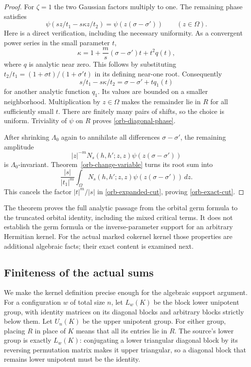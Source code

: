 \begin{proof}
For $\zeta=1$ the two Gaussian factors multiply to one.
The remaining phase satisfies
\begin{equation}\label{orb-diagonal-phase}
 \psi(sz/t_1-s\kappa z/t_2)
               =\psi(z(\sigma-\sigma'))\qquad(z\in\Omega).
\end{equation}
Here is a direct verification, including the necessary uniformity.
As a convergent power series in the small parameter $t$,
\[
 \kappa=1+\frac{m}{s}(\sigma-\sigma')t+t^2q(t),
\]
where $q$ is analytic near zero.  This follows by substituting
$t_2/t_1=(1+\sigma t)/(1+\sigma't)$ in its defining
near-one root.  Consequently
\[
 s/t_1-s\kappa/t_2
     =\sigma-\sigma'+tq_1(t)
\]
for another analytic function $q_1$.  Its values are bounded on
a smaller neighborhood.  Multiplication by $z\in\Omega$ makes
the remainder lie in $R$ for all sufficiently small $t$.
There are finitely many pairs of shifts, so the choice is uniform.
Triviality of $\psi$ on $R$ proves \eqref{orb-diagonal-phase}.

After shrinking $\Lambda_0$ again to annihilate all differences
$\sigma-\sigma'$, the remaining amplitude
\[
 |z|^{-m}N_s(h,h';z,z)\psi(z(\sigma-\sigma'))
\]
is $\Lambda_0$-invariant.  Theorem~\ref{orb-change-variable}
turns its root sum into
\[
 \frac{|s|}{|t_1|^m}
       \int_\Omega N_s(h,h';z,z)
                      \psi(z(\sigma-\sigma'))\,dz.
\]
This cancels the factor $|t|^m/|s|$ in
\eqref{orb-expanded-cut}, proving \eqref{orb-exact-cut}.
\end{proof}

The theorem proves the full analytic passage from the orbital germ
formula to the truncated orbital identity, including the mixed critical terms.
It does not establish the germ formula or the inverse-parameter
support for an arbitrary Hermitian kernel.  For the actual marked
cokernel kernel those properties are additional algebraic facts;
their exact content is examined next.

\subsection{Finiteness of the actual sums}

We make the kernel definition precise enough for the algebraic
support argument.  For a configuration $w$ of total size $n$, let
$L_w(K)$ be the block lower unipotent group, with identity matrices
on its diagonal blocks and arbitrary blocks strictly below them.
Let $U_n(K)$ be the upper unipotent group.  For either group,
placing $R$ in place of $K$ means that all its entries lie in $R$.
The source's lower group is exactly $L_w(K)$: conjugating a lower
triangular diagonal block by its reversing permutation matrix
makes it upper triangular, so a diagonal block that remains lower
unipotent must be the identity.

